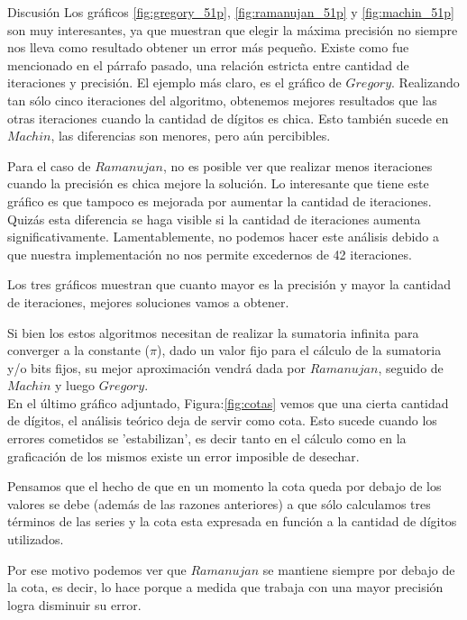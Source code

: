 \begin{section}{Discusión}
	Los gráficos \ref{fig:gregory_51p}, \ref{fig:ramanujan_51p} y \ref{fig:machin_51p} son muy interesantes, ya que muestran que elegir la máxima precisión no siempre nos lleva como resultado obtener un error más pequeño. Existe como fue mencionado en el párrafo pasado, una relación estricta entre cantidad de iteraciones y precisión. El ejemplo más claro, es el gráfico de $Gregory$. Realizando tan sólo cinco iteraciones del algoritmo, obtenemos mejores resultados que las otras iteraciones cuando la cantidad de dígitos es chica. Esto también sucede en $Machin$, las diferencias son menores, pero aún percibibles.
	
	Para el caso de $Ramanujan$, no es posible ver que realizar menos iteraciones cuando la precisión es chica mejore la solución. Lo interesante que tiene este gráfico es que tampoco es mejorada por aumentar la cantidad de iteraciones. Quizás esta diferencia se haga visible si la cantidad de iteraciones aumenta significativamente. Lamentablemente, no podemos hacer este análisis debido a que nuestra implementación no nos permite excedernos de 42 iteraciones.
	
	Los tres gráficos muestran que cuanto mayor es la precisión y mayor la cantidad de iteraciones, mejores soluciones vamos a obtener.
	
	Si bien los estos algoritmos necesitan de realizar la sumatoria infinita para converger a la constante ($\pi$), dado un valor fijo para el cálculo de la sumatoria y/o bits fijos, su mejor aproximación vendrá dada por $Ramanujan$, seguido de $Machin$ y luego $Gregory$.
	\\
	
	En el último gráfico adjuntado, Figura:\ref{fig:cotas} vemos que una cierta cantidad de dígitos, el análisis teórico deja de servir como cota. Esto sucede cuando los errores cometidos se 'estabilizan', es decir tanto en el cálculo como en la graficación de los mismos existe un error imposible de desechar.
	
	Pensamos que el hecho de que en un momento la cota queda por debajo de los valores se debe (además de las razones anteriores) a que sólo calculamos tres términos de las series y la cota esta expresada en función a la cantidad de dígitos utilizados.
	
	Por ese motivo podemos ver que $Ramanujan$ se mantiene siempre por debajo de la cota, es decir, lo hace porque a medida que trabaja con una mayor precisión logra disminuir su error.
\end{section}
